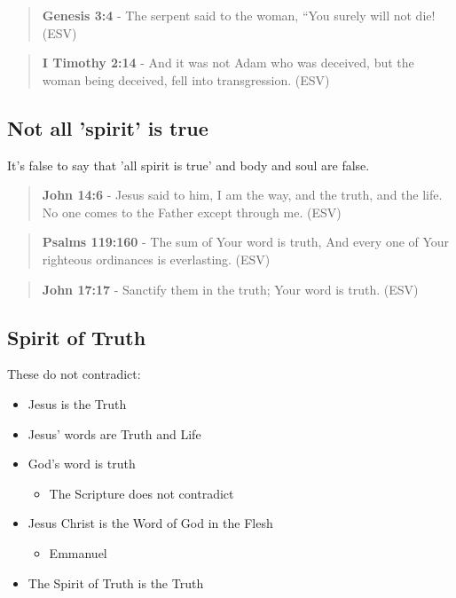 \documentclass[11pt]{article}
\begin{document}
\begin{quote}
\textbf{Genesis 3:4} - The serpent said to the woman, “You surely will not die! (ESV)
\end{quote}

\begin{quote}
\textbf{I Timothy 2:14} - And it was not Adam who was deceived, but the woman being deceived, fell into transgression. (ESV)
\end{quote}

\subsection{Not all 'spirit' is true}
\label{sec:org33122d5}
It's false to say that 'all spirit is true' and body and soul are false.

\begin{quote}
\textbf{John 14:6} - Jesus said to him, I am the way, and the truth, and the life. No one comes to the Father except through me. (ESV)
\end{quote}

\begin{quote}
\textbf{Psalms 119:160} - The sum of Your word is truth, And every one of Your righteous ordinances is everlasting. (ESV)
\end{quote}

\begin{quote}
\textbf{John 17:17} - Sanctify them in the truth; Your word is truth. (ESV)
\end{quote}

\subsection{Spirit of Truth}
\label{sec:org3d20e3a}
These do not contradict:
\begin{itemize}
\item Jesus is the Truth
\item Jesus' words are Truth and Life
\item God's word is truth
\begin{itemize}
\item The Scripture does not contradict
\end{itemize}
\item Jesus Christ is the Word of God in the Flesh
\begin{itemize}
\item Emmanuel
\end{itemize}
\item The Spirit of Truth is the Truth
\end{itemize}
\end{document}
